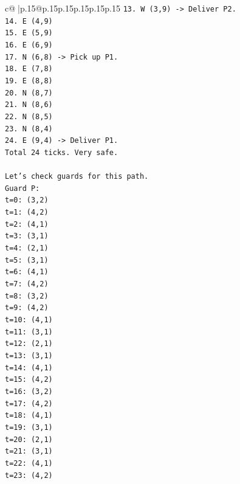 \documentclass{article}
\begin{document}
{\begin{supertabular}{c@{$\;$}|p{.15\linewidth}@{}p{.15\linewidth}p{.15\linewidth}p{.15\linewidth}p{.15\linewidth}p{.15\linewidth}}
{{{\texttt{13. W (3,9) {-}> Deliver P2.} \\
\texttt{14. E (4,9)} \\
\texttt{15. E (5,9)} \\
\texttt{16. E (6,9)} \\
\texttt{17. N (6,8) {-}> Pick up P1.} \\
\texttt{18. E (7,8)} \\
\texttt{19. E (8,8)} \\
\texttt{20. N (8,7)} \\
\texttt{21. N (8,6)} \\
\texttt{22. N (8,5)} \\
\texttt{23. N (8,4)} \\
\texttt{24. E (9,4) {-}> Deliver P1.} \\
\texttt{Total 24 ticks. Very safe.} \\
\\ 
\texttt{Let's check guards for this path.} \\
\texttt{Guard P:} \\
\texttt{t=0: (3,2)} \\
\texttt{t=1: (4,2)} \\
\texttt{t=2: (4,1)} \\
\texttt{t=3: (3,1)} \\
\texttt{t=4: (2,1)} \\
\texttt{t=5: (3,1)} \\
\texttt{t=6: (4,1)} \\
\texttt{t=7: (4,2)} \\
\texttt{t=8: (3,2)} \\
\texttt{t=9: (4,2)} \\
\texttt{t=10: (4,1)} \\
\texttt{t=11: (3,1)} \\
\texttt{t=12: (2,1)} \\
\texttt{t=13: (3,1)} \\
\texttt{t=14: (4,1)} \\
\texttt{t=15: (4,2)} \\
\texttt{t=16: (3,2)} \\
\texttt{t=17: (4,2)} \\
\texttt{t=18: (4,1)} \\
\texttt{t=19: (3,1)} \\
\texttt{t=20: (2,1)} \\
\texttt{t=21: (3,1)} \\
\texttt{t=22: (4,1)} \\
\texttt{t=23: (4,2)} \\
}}}
\end{supertabular}}
\end{document}
